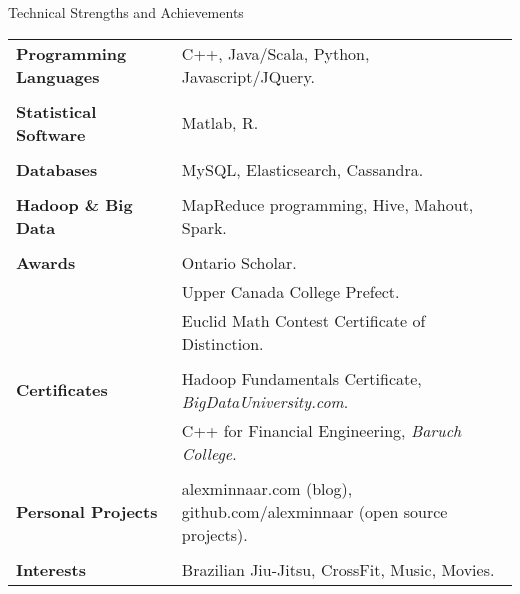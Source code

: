\documentclass{resume}
\begin{document}

\begin{rSection}{Technical Strengths and Achievements}

\begin{tabular}{ @{} >{\bfseries}l @{\hspace{6ex}} l }
Programming Languages & C++, Java/Scala, Python, Javascript/JQuery.  \\ \\
Statistical Software & Matlab, R.\\ \\
Databases & MySQL, Elasticsearch, Cassandra. \\ \\
Hadoop \& Big Data & MapReduce programming, Hive, Mahout, Spark. \\ \\
Awards & Ontario Scholar.\\ & Upper Canada College Prefect.\\ & Euclid Math Contest Certificate of Distinction.\\ \\
Certificates & Hadoop Fundamentals Certificate, \textit{BigDataUniversity.com}.\\
& C++ for Financial Engineering, \textit{Baruch College}.\\ \\
Personal Projects & alexminnaar.com (blog), github.com/alexminnaar (open source projects). \\ \\
Interests & Brazilian Jiu-Jitsu, CrossFit, Music, Movies.
\end{tabular}

\end{rSection}

\end{document}
